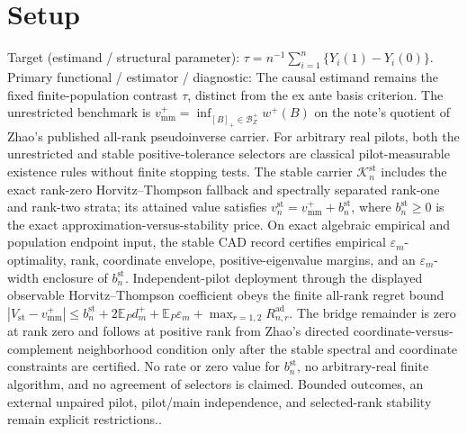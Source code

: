 \documentclass{article}
\begin{document}
\section{Setup}

Target (estimand / structural parameter): \(\tau=n^{-1}\sum_{i=1}^n\{Y_i(1)-Y_i(0)\}\).
Primary functional / estimator / diagnostic: The causal estimand remains the fixed finite-population contrast \(\tau\), distinct from the ex ante basis criterion.  The unrestricted benchmark is \(v_{\mathrm{mm}}^+=\inf_{[B]_+\in\mathcal B_Z^+}w^+(B)\) on the note's quotient of Zhao's published all-rank pseudoinverse carrier.  For arbitrary real pilots, both the unrestricted and stable positive-tolerance selectors are classical pilot-measurable existence rules without finite stopping tests.  The stable carrier \(\mathcal K_n^{\mathrm{st}}\) includes the exact rank-zero Horvitz--Thompson fallback and spectrally separated rank-one and rank-two strata; its attained value satisfies \(v_n^{\mathrm{st}}=v_{\mathrm{mm}}^++b_n^{\mathrm{st}}\), where \(b_n^{\mathrm{st}}\ge0\) is the exact approximation-versus-stability price.  On exact algebraic empirical and population endpoint input, the stable CAD record certifies empirical \(\varepsilon_m\)-optimality, rank, coordinate envelope, positive-eigenvalue margins, and an \(\varepsilon_m\)-width enclosure of \(b_n^{\mathrm{st}}\).  Independent-pilot deployment through the displayed observable Horvitz--Thompson coefficient obeys the finite all-rank regret bound \( |V_{\mathrm{st}}-v_{\mathrm{mm}}^+|\le b_n^{\mathrm{st}}+2\mathbb E_Pd_m^++\mathbb E_P\varepsilon_m+\max_{r=1,2}R_{n,r}^{\mathrm{ad}}\).  The bridge remainder is zero at rank zero and follows at positive rank from Zhao's directed coordinate-versus-complement neighborhood condition only after the stable spectral and coordinate constraints are certified.  No rate or zero value for \(b_n^{\mathrm{st}}\), no arbitrary-real finite algorithm, and no agreement of selectors is claimed.  Bounded outcomes, an external unpaired pilot, pilot/main independence, and selected-rank stability remain explicit restrictions..
\end{document}
